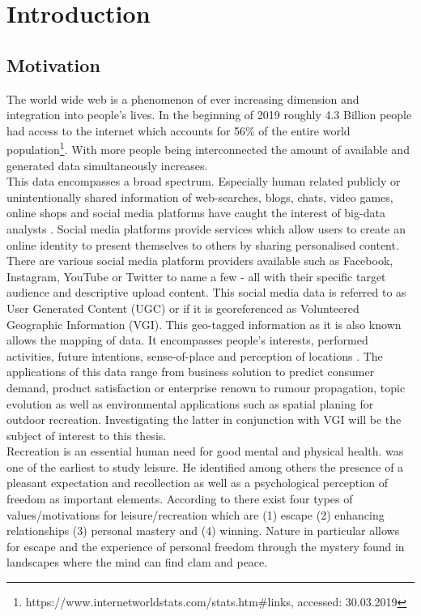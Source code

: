 \chapter{Introduction}
\section{Motivation}
The world wide web is a phenomenon of ever increasing dimension and integration into people's lives. In the beginning of 2019 roughly 4.3 Billion people had access to the internet which accounts for 56\% of the entire world population\footnote{https://www.internetworldstats.com/stats.htm\#links, accessed: 30.03.2019}. 
With more people being interconnected the amount of available and generated data simultaneously increases.\\
This data encompasses a broad spectrum. Especially human related publicly or unintentionally shared information of web-searches, blogs, chats, video games, online shops and social media platforms have caught the interest of big-data analysts \parencite{Wu2014}. Social media platforms provide services which allow users to create an online identity to present themselves to others by sharing personalised content. There are various social media platform providers available such as Facebook, Instagram, YouTube or Twitter to name a few - all with their specific target audience and descriptive upload content. This social media data is referred to as User Generated Content (UGC) or if it is georeferenced as Volunteered Geographic Information (VGI). This geo-tagged information as it is also known allows the mapping of data. It encompasses people's interests, performed activities, future intentions, sense-of-place and perception of locations \parencite{Goodchild2007}. The applications of this data range from business solution to predict consumer demand, product satisfaction or enterprise renown \parencite{Yang2019} to rumour propagation, topic evolution \parencite{Kazienko2015} as well as environmental applications such as spatial planing for outdoor recreation. Investigating the latter in conjunction with VGI will be the subject of interest to this thesis.\\
Recreation is an essential human need for good mental \parencite{Trenberth2002} and physical health. \textcite{Kaplan1960} was one of the earliest to study leisure. He identified among others the presence of a pleasant expectation and recollection as well as a psychological perception of freedom as important elements. According to \textcite{Dillard2011} there exist four types of values/motivations for leisure/recreation which are (1) escape (2) enhancing relationships (3) personal mastery and (4) winning. Nature in particular allows for escape and the experience of personal freedom through the mystery found in landscapes \parencite{Kaplan1989} where the mind can find clam and peace. \\
